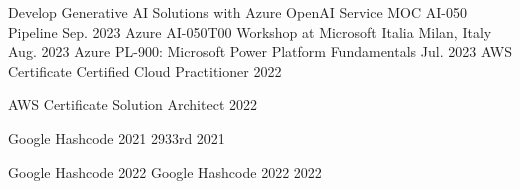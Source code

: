 



\begin{cvhonors}

  \cvhonor
    {Develop Generative AI Solutions with Azure OpenAI Service MOC AI-050} %
    {Pipeline} %
    {} %
    {Sep. 2023} %
  \cvhonor
    {Azure AI-050T00} %
    {Workshop at Microsoft Italia} %
    {Milan, Italy} %
    {Aug. 2023} %
  \cvhonor
    {Azure PL-900: Microsoft Power Platform Fundamentals} %
    {} %
    {} %
    {Jul. 2023} %
  \cvhonor
    {AWS Certificate} %
    {Certified Cloud Practitioner} %
    {} %
    {2022} %

  \cvhonor
    {AWS Certificate} %
    {Solution Architect} %
    {} %
    {2022} %

  \cvhonor
    {Google Hashcode 2021} %
    {2933rd} %
    {} %
    {2021} %

   \cvhonor
     {Google Hashcode 2022} %
     {Google Hashcode 2022} %
     {} %
     {2022} %



\end{cvhonors}


